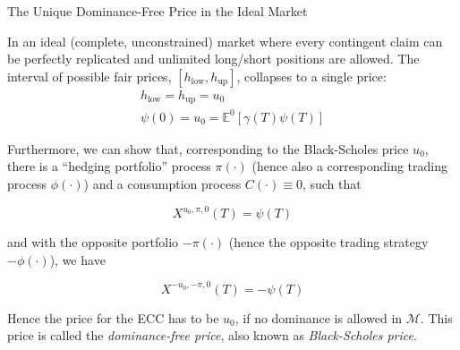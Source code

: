 \documentclass{beamer}
\begin{document}
\begin{frame}{The Unique Dominance-Free Price in the Ideal Market}

    {\footnotesize \footnotesize
    \par In an ideal (complete, unconstrained) market where every contingent claim can be perfectly replicated
    and unlimited long/short positions are allowed. The interval of possible fair prices, $ [h_{\text{low}}, h_{\text{up}}]$, 
    collapses to a single price:
    \begin{gather*}
        h_{\text{low}} = h_{\text{up}} = u_0\\
          \psi(0) = u_0 = \mathbb{E}^0[\gamma(T)\psi(T)]
    \end{gather*}
    \par  \pause Furthermore, we can show that, corresponding to the Black-Scholes price $u_0$, there is a ``hedging portfolio'' process $\pi(\cdot)$ (hence also a corresponding trading process $\phi(\cdot)$) and a consumption process $C(\cdot) \equiv 0$, such that

    \[
    X^{u_0,\pi,0}(T) = \psi(T) \tag{*}
    \]

    \par  \pause and with the opposite portfolio $-\pi(\cdot)$ (hence the opposite trading strategy $-\phi(\cdot)$), we have

    \[
    X^{-u_0,-\pi,0}(T) = -\psi(T) \tag{**}
    \]

    \par  \pause Hence the price for the ECC has to be $u_0$, if no dominance is allowed in $\mathcal{M}$. This price is called the \emph{dominance-free price}, also known as \emph{Black-Scholes price}.


    }

\end{frame} 
\end{document}

